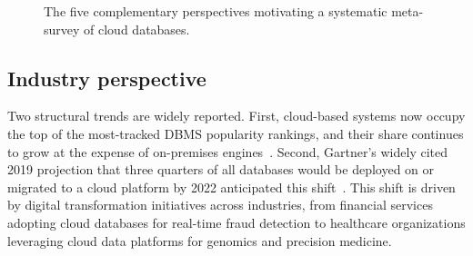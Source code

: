 \documentclass[a4paper,fleqn]{cas-sc}
\begin{document}
\begin{figure}[H]
\centering
{}
\caption{The five complementary perspectives motivating a systematic meta-survey of cloud databases.}
\label{fig:perspectives}
\end{figure}

\subsection{Industry perspective}
\label{subsec:industry}

Two structural trends are widely reported. First, cloud-based systems now occupy the top of the most-tracked DBMS popularity rankings, and their share continues to grow at the expense of on-premises engines~\cite{dbengines2026}. Second, Gartner's widely cited 2019 projection that three quarters of all databases would be deployed on or migrated to a cloud platform by 2022 anticipated this shift~\cite{gartner2019cloudshift}. This shift is driven by digital transformation initiatives across industries, from financial services adopting cloud databases for real-time fraud detection to healthcare organizations leveraging cloud data platforms for genomics and precision medicine.
\end{document}
